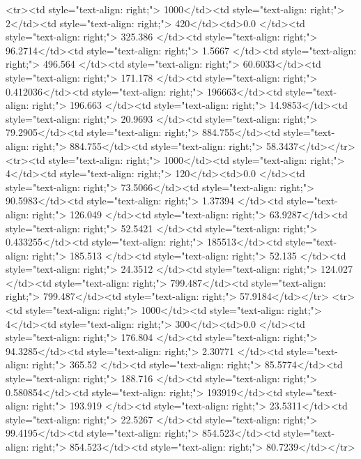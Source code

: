<tr><td style="text-align: right;">      1000</td><td style="text-align: right;">         2</td><td style="text-align: right;">           420</td><td>0.0          </td><td style="text-align: right;">               325.386 </td><td style="text-align: right;">            96.2714</td><td style="text-align: right;">         1.5667  </td><td style="text-align: right;">        496.564 </td><td style="text-align: right;">            60.6033</td><td style="text-align: right;">             171.178   </td><td style="text-align: right;">             0.412036</td><td style="text-align: right;">              196663</td><td style="text-align: right;">                      196.663 </td><td style="text-align: right;">            14.9853</td><td style="text-align: right;">                20.9693 </td><td style="text-align: right;">        79.2905</td><td style="text-align: right;">    884.755</td><td style="text-align: right;">       884.755</td><td style="text-align: right;">                 58.3437</td></tr>
<tr><td style="text-align: right;">      1000</td><td style="text-align: right;">         4</td><td style="text-align: right;">           120</td><td>0.0          </td><td style="text-align: right;">                73.5066</td><td style="text-align: right;">            90.5983</td><td style="text-align: right;">         1.37394 </td><td style="text-align: right;">        126.049 </td><td style="text-align: right;">            63.9287</td><td style="text-align: right;">              52.5421  </td><td style="text-align: right;">             0.433255</td><td style="text-align: right;">              185513</td><td style="text-align: right;">                      185.513 </td><td style="text-align: right;">            52.135 </td><td style="text-align: right;">                24.3512 </td><td style="text-align: right;">       124.027 </td><td style="text-align: right;">    799.487</td><td style="text-align: right;">       799.487</td><td style="text-align: right;">                 57.9184</td></tr>
<tr><td style="text-align: right;">      1000</td><td style="text-align: right;">         4</td><td style="text-align: right;">           300</td><td>0.0          </td><td style="text-align: right;">               176.804 </td><td style="text-align: right;">            94.3285</td><td style="text-align: right;">         2.30771 </td><td style="text-align: right;">        365.52  </td><td style="text-align: right;">            85.5774</td><td style="text-align: right;">             188.716   </td><td style="text-align: right;">             0.580854</td><td style="text-align: right;">              193919</td><td style="text-align: right;">                      193.919 </td><td style="text-align: right;">            23.5311</td><td style="text-align: right;">                22.5267 </td><td style="text-align: right;">        99.4195</td><td style="text-align: right;">    854.523</td><td style="text-align: right;">       854.523</td><td style="text-align: right;">                 80.7239</td></tr>
